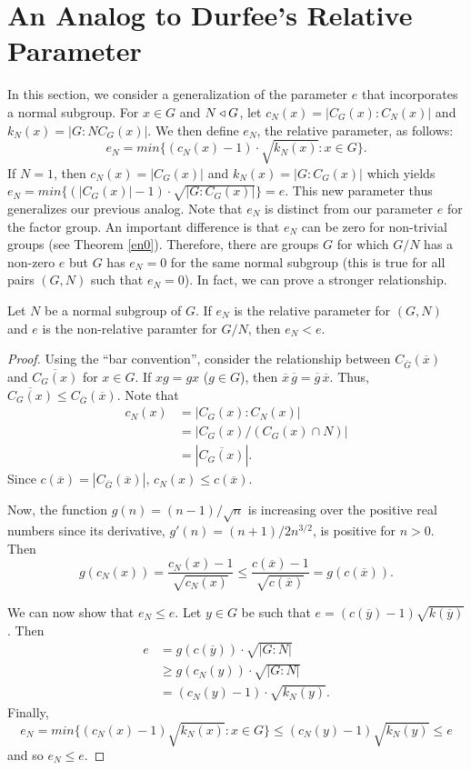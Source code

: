 \documentclass[main.tex]{subfiles}
\begin{document}
\chapter{An Analog to Durfee's Relative Parameter}

In this section, we consider a generalization of the parameter $e$ that incorporates a normal subgroup. For $x \in G$ and $N \triangleleft G$, let $c_N(x) = |C_G(x):C_N(x)|$ and $k_N(x) = |G:NC_G(x)|$. We then define $e_N$, the relative parameter, as follows:
$$e_N = min\{(c_N(x) - 1) \cdot \sqrt{k_N(x)} : x \in G\}\text{.}$$
If $N=1$, then $c_N(x) = |C_G(x)|$ and $k_N(x) = |G:C_G(x)|$ which yields $e_N = min\{(|C_G(x)| - 1)\cdot\sqrt{|G:C_G(x)|}\} = e$. This new parameter thus generalizes our previous analog. Note that $e_N$ is distinct from our parameter $e$ for the factor group. An important difference is that $e_N$ can be zero for non-trivial groups (see Theorem \ref{en0}). Therefore, there are groups $G$ for which $G/N$ has a non-zero $e$ but $G$ has $e_N = 0$ for the same normal subgroup (this is true for all pairs $(G, N)$ such that $e_N = 0$). In fact, we can prove a stronger relationship.

\begin{theorem}
Let $N$ be a normal subgroup of $G$. If $e_N$ is the relative parameter for $(G, N)$ and $e$ is the non-relative paramter for $G/N$, then $e_N < e$.
\end{theorem}

\begin{proof}
Using the ``bar convention'', consider the relationship between $C_{\overline{G}}(\overline{x})$ and $\overline{C_G(x)}$ for $x \in G$. If $xg = gx$ ($g \in G$), then $\overline{x}\, \overline{g} = \overline{g}\, \overline{x}$. Thus, $\overline{C_G(x)} \le C_{\overline{G}}(\overline{x})$. Note that
\begin{align*}
c_N(x) &= |C_G(x) : C_N(x)| \\
&= |C_G(x)/(C_G(x) \cap N)| \\
&= |\overline{C_G(x)}| \text{.}
\end{align*}
Since $c(\overline{x}) = |C_{\overline{G}}(\overline{x})|$, $c_N(x) \le c(\overline{x})$.

Now, the function $g(n) = (n-1)/\sqrt{n}$ is increasing over the positive real numbers since its derivative, $g'(n)=(n+1)/2n^{3/2}$, is positive for $n>0$. Then
$$g(c_N(x)) = \frac{c_N(x)-1}{\sqrt{c_N(x)}} \le \frac{c(\overline{x})-1}{\sqrt{c(\overline{x})}} = g(c(\overline{x}))\text{.}$$

We can now show that $e_N \le e$. Let $y \in G$ be such that $e = (c(\overline{y}) - 1) \sqrt{k(\overline{y})}$.  Then
\begin{align*}
e &= g(c(\overline{y})) \cdot \sqrt{|G:N|} \\
&\ge g(c_N(y)) \cdot \sqrt{|G:N|} \\
&= (c_N(y) - 1) \cdot \sqrt{k_N(y)} \text{.}
\end{align*}
Finally, 
$$e_N = min\{(c_N(x) - 1) \sqrt{k_N(x)} : x \in G\} \le (c_N(y) - 1) \sqrt{k_N(y)} \le e$$
and so $e_N \le e$.
\end{proof}
\end{document}
